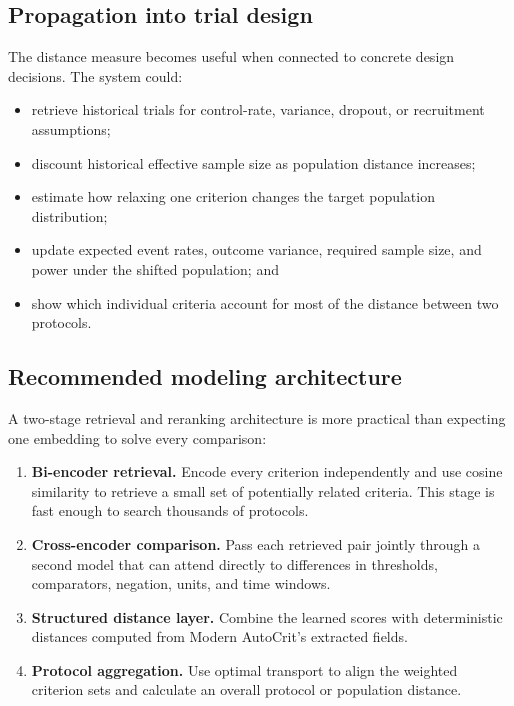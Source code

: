 \documentclass[11pt]{article}
\begin{document}
\subsection*{Propagation into trial design}

The distance measure becomes useful when connected to concrete design decisions. The system could:

\begin{itemize}
    \item retrieve historical trials for control-rate, variance, dropout, or recruitment assumptions;
    \item discount historical effective sample size as population distance increases;
    \item estimate how relaxing one criterion changes the target population distribution;
    \item update expected event rates, outcome variance, required sample size, and power under the shifted population; and
    \item show which individual criteria account for most of the distance between two protocols.
\end{itemize}

\subsection*{Recommended modeling architecture}

A two-stage retrieval and reranking architecture is more practical than expecting one embedding to solve every comparison:

\begin{enumerate}
    \item \textbf{Bi-encoder retrieval.} Encode every criterion independently and use cosine similarity to retrieve a small set of potentially related criteria. This stage is fast enough to search thousands of protocols.
    \item \textbf{Cross-encoder comparison.} Pass each retrieved pair jointly through a second model that can attend directly to differences in thresholds, comparators, negation, units, and time windows.
    \item \textbf{Structured distance layer.} Combine the learned scores with deterministic distances computed from Modern AutoCrit's extracted fields.
    \item \textbf{Protocol aggregation.} Use optimal transport to align the weighted criterion sets and calculate an overall protocol or population distance.
\end{enumerate}
\end{document}
